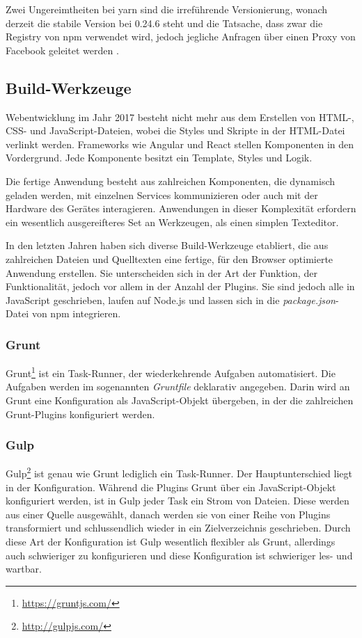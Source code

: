 Zwei Ungereimtheiten bei yarn sind die irreführende Versionierung, wonach derzeit die stabile Version bei 0.24.6 steht und die Tatsache, dass zwar die Registry von npm verwendet wird, jedoch jegliche Anfragen über einen Proxy von Facebook geleitet werden \autocite{Nemeth.yarnpkg:online}.


\subsection{Build-Werkzeuge}
\label{sub:build-tools}
Webentwicklung im Jahr 2017 besteht nicht mehr aus dem Erstellen von HTML-, CSS- und JavaScript-Dateien, wobei die Styles und Skripte in der HTML-Datei verlinkt werden.
Frameworks wie Angular und React stellen Komponenten in den Vordergrund.
Jede Komponente besitzt ein Template, Styles und Logik.

Die fertige Anwendung besteht aus zahlreichen Komponenten, die dynamisch geladen werden, mit einzelnen Services kommunizieren oder auch mit der Hardware des Gerätes interagieren.
Anwendungen in dieser Komplexität erfordern ein wesentlich ausgereifteres Set an Werkzeugen, als einen simplen Texteditor.

In den letzten Jahren haben sich diverse Build-Werkzeuge etabliert, die aus zahlreichen Dateien und Quelltexten eine fertige, für den Browser optimierte Anwendung erstellen.
Sie unterscheiden sich in der Art der Funktion, der Funktionalität, jedoch vor allem in der Anzahl der Plugins.
Sie sind jedoch alle in JavaScript geschrieben, laufen auf Node.js und lassen sich in die \emph{package.json}-Datei von npm integrieren.

\subsubsection{Grunt}
\label{sub:grunt}
Grunt\footnote{\url{https://gruntjs.com/}} ist ein Task-Runner, der wiederkehrende Aufgaben automatisiert.
Die Aufgaben werden im sogenannten \emph{Gruntfile} deklarativ angegeben.
Darin wird an Grunt eine Konfiguration als JavaScript-Objekt übergeben, in der die zahlreichen Grunt-Plugins konfiguriert werden.

\subsubsection{Gulp}
\label{sub:gulp}
Gulp\footnote{\url{http://gulpjs.com/}} ist genau wie Grunt lediglich ein Task-Runner.
Der Hauptunterschied liegt in der Konfiguration.
Während die Plugins Grunt über ein JavaScript-Objekt konfiguriert werden, ist in Gulp jeder Task ein Strom von Dateien.
Diese werden aus einer Quelle ausgewählt, danach werden sie von einer Reihe von Plugins transformiert und schlussendlich wieder in ein Zielverzeichnis geschrieben.
Durch diese Art der Konfiguration ist Gulp wesentlich flexibler als Grunt, allerdings auch schwieriger zu konfigurieren und diese Konfiguration ist schwieriger les- und wartbar.

